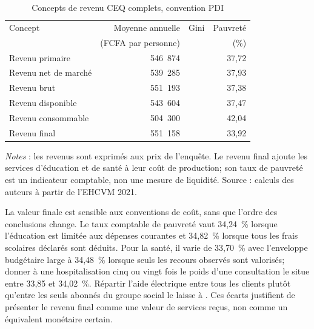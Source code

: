 \documentclass[11pt,a4paper]{article}
\begin{document}
\begin{table}[t]
\centering
\begin{threeparttable}
\caption{Concepts de revenu CEQ complets, convention PDI}
\label{tab:income-complete}
\small
\begin{tabular}{lrrr}
\toprule
Concept & Moyenne annuelle & Gini & Pauvreté \\
        & (FCFA par personne) & & (\%) \\
\midrule
Revenu primaire      & 546~874 & \GiniPrimaire{} & 37,72 \\
Revenu net de marché & 539~285 & \GiniNetMarche{} & 37,93 \\
Revenu brut          & 551~193 & \GiniBrut{} & 37,38 \\
Revenu disponible    & 543~604 & \GiniDisponible{} & 37,47 \\
Revenu consommable   & 504~300 & \GiniConsommable{} & 42,04 \\
Revenu final         & 551~158 & \GiniFinal{} & 33,92 \\
\bottomrule
\end{tabular}
\begin{tablenotes}\footnotesize
\item \emph{Notes} : les revenus sont exprimés aux prix de l'enquête. Le revenu
final ajoute les services d'éducation et de santé à leur coût de production;
son taux de pauvreté est un indicateur comptable, non une mesure de liquidité.
Source : calculs des auteurs à partir de l'EHCVM 2021.
\end{tablenotes}
\end{threeparttable}
\end{table}

La valeur finale est sensible aux conventions de coût, sans que l'ordre des
conclusions change. Le taux comptable de pauvreté vaut 34,24~\% lorsque
l'éducation est limitée aux dépenses courantes et 34,82~\% lorsque tous les
frais scolaires déclarés sont déduits. Pour la santé, il varie de 33,70~\% avec
l'enveloppe budgétaire large à 34,48~\% lorsque seuls les recours observés sont
valorisés; donner à une hospitalisation cinq ou vingt fois le poids d'une
consultation le situe entre 33,85 et 34,02~\%. Répartir l'aide électrique entre
tous les clients plutôt qu'entre les seuls abonnés du groupe social le laisse à
\PauvreteFinale{}. Ces écarts justifient de présenter le revenu final comme une valeur de
services reçus, non comme un équivalent monétaire certain.
\end{document}
